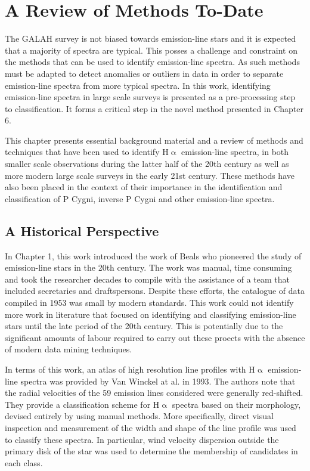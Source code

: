 \chapter{A Review of Methods To-Date}

The GALAH survey is not biased towards emission-line stars and it is expected that a majority of spectra are typical. This posses a challenge and constraint on the methods that can be used to identify emission-line spectra. As such methods must be adapted to detect anomalies or outliers in data in order to separate emission-line spectra from more typical spectra. In this work, identifying emission-line spectra in large scale surveys is presented as a pre-processing step to classification. It forms a critical step in the novel method presented in Chapter 6. 

This chapter presents essential background material and a review of methods and techniques that have been used to identify H$\upalpha$ emission-line spectra, in both smaller scale observations during the latter half of the 20th century as well as more modern large scale surveys in the early 21st century. These methods have also been placed in the context of their importance in the identification and classification of P Cygni, inverse P Cygni and other emission-line spectra.

\section{A Historical Perspective}
In Chapter 1, this work introduced the work of Beals who pioneered the study of emission-line stars in the 20th century. The work was manual, time consuming and took the researcher decades to compile \cite{1953PDAO....9....1B} with the assistance of a team that included secretaries and draftspersons. Despite these efforts, the catalogue of data compiled in 1953 was small by modern standards. This work could not identify more work in literature that focused on identifying and classifying emission-line stars until the late period of the 20th century. This is potentially due to the significant amounts of labour required to carry out these proects with the absence of modern data mining techniques. 

In terms of this work, an atlas of high resolution line profiles with H$\upalpha$ emission-line spectra was provided by Van Winckel at al. in 1993\cite{van1993atlas}. The authors note that the radial velocities of the 59 emission lines considered were generally red-shifted. They provide a classification scheme for H$\upalpha$ spectra based on their morphology, devised entirely by using manual methods. More specifically, direct visual inspection and measurement of the width and shape of the line profile was used to classify these spectra. In particular, wind velocity dispersion outside the primary disk of the star was used to determine the membership of candidates in each class.

